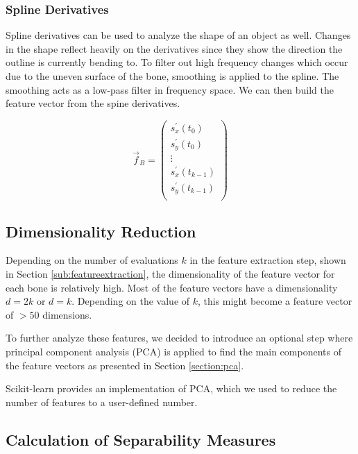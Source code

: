 \documentclass[pdftex,12pt,a4paper]{report}
\begin{document}
\subsubsection{Spline Derivatives}

Spline derivatives can be used to analyze the shape of an object as well. Changes in the shape reflect heavily
on the derivatives since they show the direction the outline is currently bending to. To filter out high frequency
changes which occur due to the uneven surface of the bone, smoothing is applied to the spline. The smoothing acts as a low-pass filter in frequency space. We can then build the feature vector from the spine derivatives.

\begin{equation}
\vec{f}_B = \left( \begin{array}{c}
s^\prime_{x}(t_{0}) \\
s^\prime_{y}(t_{0}) \\
\vdots \\
s^\prime_{x}(t_{k-1}) \\
s^\prime_{y}(t_{k-1}) \\
\end{array} \right)  
\end{equation}

\subsection{Dimensionality Reduction}

Depending on the number of evaluations $k$ in the feature extraction step, shown in Section
\ref{sub:featureextraction}, the dimensionality of the feature vector for each bone is relatively high. Most of 
the feature vectors have a dimensionality $d = 2k$ or $d = k$. Depending on the value of $k$, this might become
a feature vector of $> 50$ dimensions.

To further analyze these features, we decided to introduce an optional step where principal component analysis
(PCA) is applied to find the main components of the feature vectors as presented in Section \ref{section:pca}. 

Scikit-learn \cite{pedregosa2011scikit} provides an implementation of PCA, which we used to reduce the number of features to a user-defined number.

\subsection{Calculation of Separability Measures}
\end{document}
